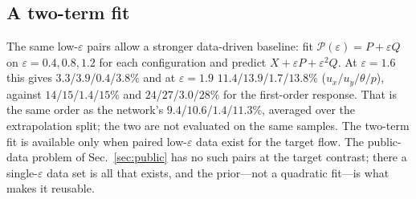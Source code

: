 \documentclass[preprint,11pt,a4paper,times,doubleblind]{elsarticle}
\begin{document}
\subsection*{A two-term fit} The same low-$\varepsilon$ pairs allow a stronger
data-driven baseline: fit $\mathcal{P}(\varepsilon)=P+\varepsilon Q$ on $\varepsilon=0.4,0.8,1.2$ for each
configuration and predict $X+\varepsilon P+\varepsilon^2Q$. At $\varepsilon=1.6$ this gives
$3.3$/$3.9$/$0.4$/$3.8\%$ and at $\varepsilon=1.9$ $11.4$/$13.9$/$1.7$/$13.8\%$
($u_x/u_y/\theta/p$), against $14$/$15$/$1.4$/$15\%$ and $24$/$27$/$3.0$/$28\%$ for the
first-order response. That is the same order as the network's $9.4$/$10.6$/$1.4$/$11.3\%$,
averaged over the extrapolation split; the two are not evaluated on the same samples. The two-term fit is available only when paired
low-$\varepsilon$ data exist for the target flow. The public-data problem of Sec.~\ref{sec:public}
has no such pairs at the target contrast; there a single-$\varepsilon$ data set is all that exists,
and the prior---not a quadratic fit---is what makes it reusable.
\end{document}
